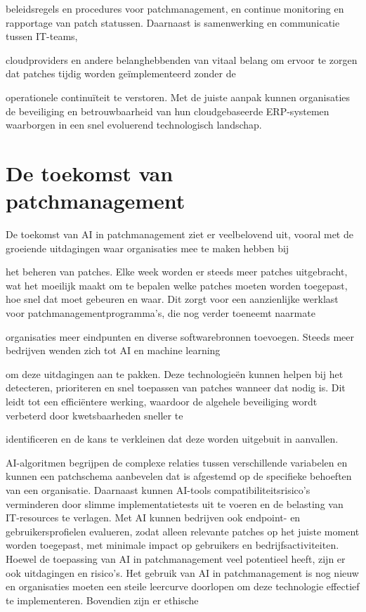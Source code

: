 beleidsregels en procedures voor patchmanagement, en continue monitoring en rapportage van patch statussen. Daarnaast is samenwerking en communicatie tussen IT-teams, 

cloudproviders en andere belanghebbenden van vitaal belang om ervoor te zorgen dat patches tijdig worden geïmplementeerd zonder de 

operationele continuïteit te verstoren. Met de juiste aanpak kunnen organisaties de beveiliging en betrouwbaarheid van hun cloudgebaseerde ERP-systemen waarborgen in een snel evoluerend technologisch landschap.


\section{De toekomst van patchmanagement}
De toekomst van AI in patchmanagement ziet er veelbelovend uit, vooral met de groeiende uitdagingen waar organisaties mee te maken hebben bij

het beheren van patches. Elke week worden er steeds meer patches uitgebracht, wat het moeilijk maakt om te bepalen welke patches moeten worden toegepast, hoe snel dat moet gebeuren en waar. Dit zorgt voor een aanzienlijke werklast voor patchmanagementprogramma's, die nog verder toeneemt naarmate

organisaties meer eindpunten en diverse softwarebronnen toevoegen. Steeds meer bedrijven wenden zich tot AI en machine learning

om deze uitdagingen aan te pakken. Deze technologieën kunnen helpen bij het detecteren, prioriteren en snel toepassen van patches wanneer dat nodig is. Dit leidt tot een efficiëntere werking, waardoor de algehele beveiliging wordt verbeterd door kwetsbaarheden sneller te 

identificeren en de kans te verkleinen dat deze worden uitgebuit in aanvallen.

AI-algoritmen begrijpen de complexe relaties tussen verschillende variabelen en kunnen een patchschema aanbevelen dat is afgestemd op de specifieke behoeften van een organisatie. Daarnaast kunnen AI-tools compatibiliteitsrisico's verminderen door slimme implementatietests uit te voeren en de belasting van IT-resources te verlagen. Met AI kunnen bedrijven ook
 endpoint- en gebruikersprofielen evalueren, zodat alleen relevante patches op het juiste moment worden toegepast, met minimale impact op gebruikers en bedrijfsactiviteiten. Hoewel de toepassing van AI in patchmanagement veel potentieel heeft, zijn er ook uitdagingen en risico's. Het gebruik van AI in patchmanagement is nog nieuw en organisaties moeten een steile leercurve doorlopen om deze technologie effectief te implementeren. Bovendien zijn er ethische 

